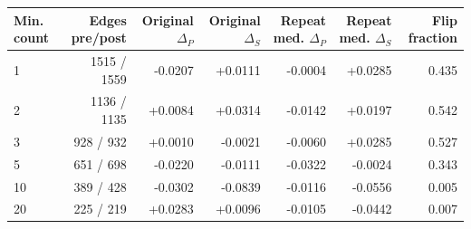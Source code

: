 \begin{tabular}{lrrrrrr}
\toprule
Min. count & Edges pre/post & Original $\Delta_P$ & Original $\Delta_S$ & Repeat med. $\Delta_P$ & Repeat med. $\Delta_S$ & Flip fraction \\
\midrule
1 & 1515 / 1559 & -0.0207 & +0.0111 & -0.0004 & +0.0285 & 0.435 \\
2 & 1136 / 1135 & +0.0084 & +0.0314 & -0.0142 & +0.0197 & 0.542 \\
3 & 928 / 932 & +0.0010 & -0.0021 & -0.0060 & +0.0285 & 0.527 \\
5 & 651 / 698 & -0.0220 & -0.0111 & -0.0322 & -0.0024 & 0.343 \\
10 & 389 / 428 & -0.0302 & -0.0839 & -0.0116 & -0.0556 & 0.005 \\
20 & 225 / 219 & +0.0283 & +0.0096 & -0.0105 & -0.0442 & 0.007 \\
\bottomrule
\end{tabular}
